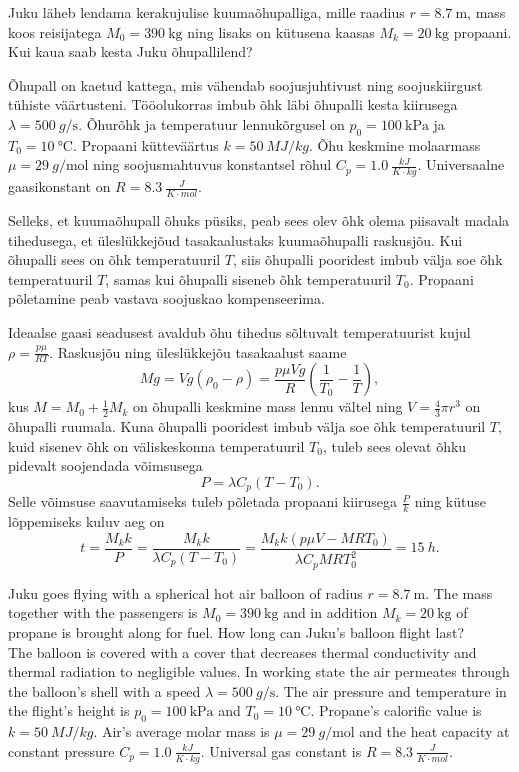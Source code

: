 
Juku läheb lendama kerakujulise kuumaõhupalliga, mille raadius $r = \SI{8.7}{\metre}$, mass koos reisijatega $M_0= \SI{390}{\kg}$ ning lisaks on kütusena kaasas $M_k = \SI{20}{\kg}$ propaani. Kui kaua saab kesta Juku õhupallilend? 

Õhupall on kaetud kattega, mis vähendab soojusjuhtivust ning soojuskiirgust tühiste väärtusteni. Tööolukorras imbub õhk läbi õhupalli kesta kiirusega $\lambda = \SI{500}{g\per\s}$. Õhurõhk ja temperatuur lennukõrgusel on $p_0 = \SI{100}{\kilo\Pa}$ ja $T_0 = \SI{10}{\degreeCelsius}$. Propaani kütteväärtus $k = \SI{50}{MJ/kg}$. Õhu keskmine molaarmass $\mu = \SI{29}{g\per\mole}$ ning soojusmahtuvus konstantsel rõhul $C_p = \SI{1.0}{\frac{kJ}{K\cdot kg}}$. Universaalne gaasikonstant on $R = \SI{8.3}{\frac{J}{K\cdot mol}}$.

\hint
Selleks, et kuumaõhupall õhuks püsiks, peab sees olev õhk olema piisavalt madala tihedusega, et üleslükkejõud tasakaalustaks kuumaõhupalli raskusjõu. Kui õhupalli sees on õhk temperatuuril $T$, siis õhupalli pooridest imbub välja soe õhk temperatuuril $T$, samas kui õhupalli siseneb õhk temperatuuril $T_0$. Propaani põletamine peab vastava soojuskao kompenseerima.

\solu
Ideaalse gaasi seadusest avaldub õhu tihedus sõltuvalt temperatuurist kujul $\rho = \frac{p \mu}{R T}$. Raskusjõu ning üleslükkejõu tasakaalust saame
\[
M g = V g (\rho_0 - \rho) = \frac{p \mu V g}{R} (\frac{1}{T_0} - \frac{1}{T}),
\]
kus $M = M_0 + \frac{1}{2} M_k$ on õhupalli keskmine mass lennu vältel ning $V = \frac{4}{3} \pi r^3$ on õhupalli ruumala. Kuna õhupalli pooridest imbub välja soe õhk temperatuuril $T$, kuid sisenev õhk on väliskeskonna temperatuuril $T_0$, tuleb sees olevat õhku pidevalt soojendada võimsusega
\[
P = \lambda C_p (T - T_0).
\]
Selle võimsuse saavutamiseks tuleb põletada propaani kiirusega $\frac{P}{k}$ ning kütuse lõppemiseks kuluv aeg on
\[
t = \frac{M_k k}{P} = \frac{M_k k}{\lambda C_p (T - T_0)} = \frac{M_k k (p \mu V - M R T_0)}{\lambda C_p M R T_0^2} = \SI{15}{h}.
\]

Juku goes flying with a spherical hot air balloon of radius $r = \SI{8.7}{\metre}$. The mass together with the passengers is $M_0= \SI{390}{\kg}$ and in addition $M_k = \SI{20}{\kg}$ of propane is brought along for fuel. How long can Juku's balloon flight last?\\ 
The balloon is covered with a cover that decreases thermal conductivity and thermal radiation to negligible values. In working state the air permeates through the balloon's shell with a speed $\lambda = \SI{500}{g\per\s}$. The air pressure and temperature in the flight's height is $p_0 = \SI{100}{\kilo\Pa}$ and $T_0 = \SI{10}{\degreeCelsius}$. Propane's calorific value is $k = \SI{50}{MJ/kg}$. Air's average molar mass is $\mu = \SI{29}{g\per\mole}$ and the heat capacity at constant pressure $C_p = \SI{1.0}{\frac{kJ}{K\cdot kg}}$. Universal gas constant is $R = \SI{8.3}{\frac{J}{K\cdot mol}}$.

